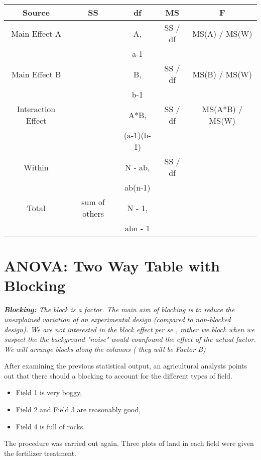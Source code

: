 \documentclass[12pt]{article}
\begin{document}
	\begin{tabular}{|c|c|c|c|c|}
		\hline Source	&	SS	&	df	&	MS	&	F	\\	\hline \hline
		Main Effect A	&	\phantom{given}	&	A,	&	SS / df	&	MS(A) / MS(W)	\\	
		&		&	a-1	&		&		\\	\hline
		Main Effect B	&	\phantom{given}		&	B,	&	SS / df	&	MS(B) / MS(W)	\\	
		&		&	b-1	&		&		\\	\hline
		Interaction Effect	&	\phantom{given}		&	A*B,	&	SS / df	&	MS(A*B) / MS(W)	\\	
		&		&	(a-1)(b-1)	&		&		\\	\hline
		Within	&	\phantom{given}		&	N - ab,	&	SS / df	&		\\	
		&		&	ab(n-1)	&		&		\\	\hline
		Total	&	sum of others	&	N - 1,	&		&		\\	
		&		&	abn - 1	&		&		\\	\hline
		
	\end{tabular} 	 	 
	


\newpage
	



\section*{ANOVA: Two Way Table with Blocking}

\begin{framed}
\noindent \textit{\textbf{Blocking:} The block is a factor. The main aim of blocking is to reduce the unexplained variation of an experimental design (compared to non-blocked design). We are not interested in the block effect per se , rather we block when we suspect the the background "noise" would counfound the effect of the actual factor.}\\
\textit{We will arrange blocks along the columns ( they will be Factor B)}
\end{framed}
\bigskip

After examining the previous statistical output, an agricultural analysts points out that there should a blocking to account for the different types of field. 
\begin{itemize}
\item Field 1 is very boggy, 
\item Field 2 and Field 3 are reasonably good,
\item Field 4 is full of rocks.
\end{itemize}
The procedure was carried out again. Three plots of land in each field were given the fertilizer treatment.
\end{document}
